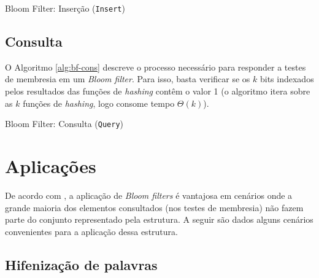 \documentclass[12pt,twoside,english,brazilian]{book}
\begin{document}
\begin{algorithm}
    \caption{Bloom Filter: Inserção (\texttt{Insert})}\label{alg:bf-ins}

\end{algorithm}

\subsection{Consulta}

O Algoritmo \ref{alg:bf-cons} descreve o processo necessário para responder a testes de membresia em um \textit{Bloom filter}. Para isso, basta verificar se os $k$ bits indexados pelos resultados das funções de \textit{hashing} contêm o valor 1 (o algoritmo itera sobre as $k$ funções de \textit{hashing}, logo consome tempo $\Theta(k)$).

\begin{algorithm}
    \caption{Bloom Filter: Consulta (\texttt{Query})}\label{alg:bf-cons}

\end{algorithm}

\section{Aplicações}

De acordo com \citet{bloom}, a aplicação de \textit{Bloom filters} é vantajosa em cenários onde a grande maioria dos elementos consultados (nos testes de membresia) não fazem parte do conjunto representado pela estrutura. A seguir são dados alguns cenários convenientes para a aplicação dessa estrutura.

\subsection{Hifenização de palavras}
\end{document}
